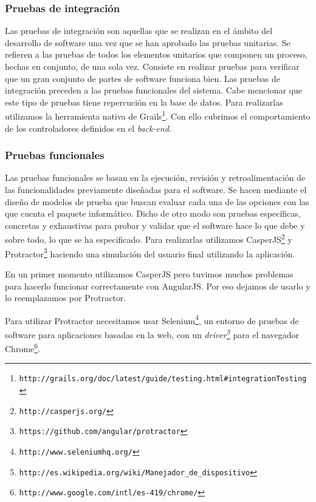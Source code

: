\subsubsection{Pruebas de integración}
Las pruebas de integración son aquellas que se realizan en el ámbito del desarrollo de software una vez que se han aprobado las pruebas unitarias. Se refieren a las pruebas de todos los elementos unitarios que componen un proceso, hechas en conjunto, de una sola vez. Consiste en realizar pruebas para verificar que un gran conjunto de partes de software funciona bien. Las pruebas de integración preceden a las pruebas funcionales del sistema. Cabe mencionar que este tipo de pruebas tiene repercución en la base de datos. Para realizarlas utilizamos la herramienta nativa de Grails\footnote{\texttt{http://grails.org/doc/latest/guide/testing.html\#integrationTesting}}. Con ello cubrimos el comportamiento de los controladores definidos en el \textit{back-end}.

\subsubsection{Pruebas funcionales}
Las pruebas funcionales se basan en la ejecución, revisión y retroalimentación de las funcionalidades previamente diseñadas para el software. Se hacen mediante el diseño de modelos de prueba que buscan evaluar cada una de las opciones con las que cuenta el paquete informático. Dicho de otro modo son pruebas específicas, concretas y exhaustivas para probar y validar que el software hace lo que debe y sobre todo, lo que se ha especificado. Para realizarlas utilizamos CasperJS\footnote{\texttt{http://casperjs.org/}} y Protractor\footnote{\texttt{https://github.com/angular/protractor}} haciendo una simulación del usuario final utilizando la aplicación.

En un primer momento utilizamos CasperJS pero tuvimos muchos problemas para hacerlo funcionar correctamente con AngularJS. Por eso dejamos de usarlo y lo reemplazamos por Protractor.

Para utilizar Protractor necesitamos usar Selenium\footnote{\texttt{http://www.seleniumhq.org/}}, un entorno de pruebas de software para aplicaciones basadas en la web, con un \textit{driver\footnote{\texttt{http://es.wikipedia.org/wiki/Manejador\_de\_dispositivo}}} para el navegador  Chrome\footnote{\texttt{http://www.google.com/intl/es-419/chrome/}}.

